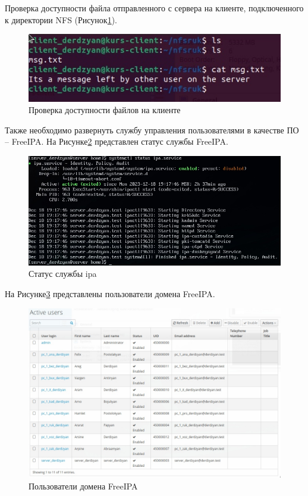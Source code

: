 Проверка доступности файла отправленного с сервера на клиенте, подключенного к директории NFS (Рисунок\;\ref{fig:NFS_client}).

\begin{figure}[H]
\centering
\includegraphics[scale=0.5]{../misc/NFS_client.jpg}
\caption{Проверка доступности файлов на клиенте\label{fig:NFS_client}}
\end{figure}

Также необходимо развернуть службу управления пользователями в качестве ПО – FreeIPA. На Рисунке\;\ref{fig:IPA_status} представлен статус службы FreeIPA.

\begin{figure}[H]
\centering
\includegraphics[scale=0.5]{../misc/IPA_status.jpg}
\caption{Статус службы ipa\label{fig:IPA_status}}
\end{figure}

На Рисунке\;\ref{fig:IPA_users} представлены пользователи домена FreeIPA.

\begin{figure}[H]
\centering
\includegraphics[scale=0.35]{../misc/IPA_users.jpg}
\caption{Пользователи домена FreeIPA\label{fig:IPA_users}}
\end{figure}

